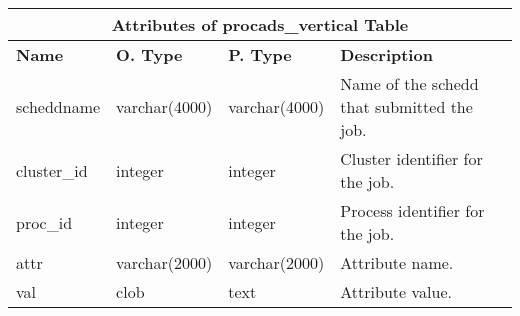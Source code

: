 \begin{center}
  \begin{tabular}{|l|l|l|p{3.2in}|}\hline
    \multicolumn{4}{|c|}{\textbf{Attributes of procads\_vertical Table}}\\ \hline
    \textbf{Name} & \textbf{O. Type} & \textbf{P. Type} & \textbf{Description}\\ \hline
    scheddname & varchar(4000) & varchar(4000) & Name of the schedd that submitted the job.\\ \hline
    cluster\_id & integer & integer & Cluster identifier for the job.\\ \hline
    proc\_id & integer & integer & Process identifier for the job.\\ \hline
    attr & varchar(2000) & varchar(2000) & Attribute name.\\ \hline
    val & clob & text & Attribute value.\\ \hline
  \end{tabular}
\vspace{24pt}
\end{center}


